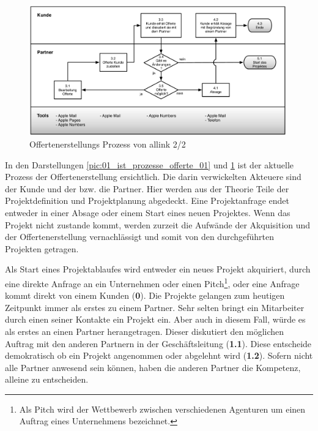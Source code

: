\begin{figure}[p]
\begin{center}
\includegraphics[width=0.99\textwidth,angle=0]{./bilder/analyse/01_ist_prozesse_offerte_02.pdf}
\caption[Offertenerstellungs Prozess von allink 2/2]{Offertenerstellungs 
    Prozess von allink 2/2\footnotemark}
\label{pic:01_ist_prozesse_offerte_02}
\end{center}
\end{figure}

In den Darstellungen \ref{pic:01_ist_prozesse_offerte_01} und
\ref{pic:01_ist_prozesse_offerte_02} ist der aktuelle Prozess der Offertenerstellung 
ersichtlich. Die darin verwickelten Akteuere sind der Kunde und der bzw. die Partner.
Hier werden aus der Theorie Teile der Projektdefinition und Projektplanung abgedeckt.
Eine Projektanfrage endet entweder in einer Absage oder einem Start eines neuen 
Projektes. Wenn das Projekt nicht zustande kommt, werden zurzeit die Aufwände der
Akquisition und der Offertenerstellung vernachlässigt und somit von
den durchgeführten Projekten getragen.

Als Start eines Projektablaufes wird entweder ein neues Projekt akquiriert, 
durch eine direkte Anfrage an ein Unternehmen oder einen Pitch\footnote{Als Pitch 
wird der Wettbewerb zwischen verschiedenen Agenturen um einen Auftrag eines 
Unternehmens bezeichnet.}, oder eine Anfrage kommt direkt von einem Kunden (\textbf{0}). 
Die Projekte gelangen zum heutigen Zeitpunkt immer als erstes zu einem Partner. 
Sehr selten bringt ein Mitarbeiter durch einen seiner Kontakte ein Projekt ein. 
Aber auch in diesem Fall, würde es als erstes an einen Partner herangetragen.
Dieser diskutiert den möglichen Auftrag mit den anderen Partnern in der 
Geschäftsleitung (\textbf{1.1}). Diese entscheide demokratisch ob ein Projekt 
angenommen oder abgelehnt wird (\textbf{1.2}). Sofern nicht alle Partner anwesend 
sein können, haben die anderen Partner die Kompetenz, alleine zu entscheiden.

